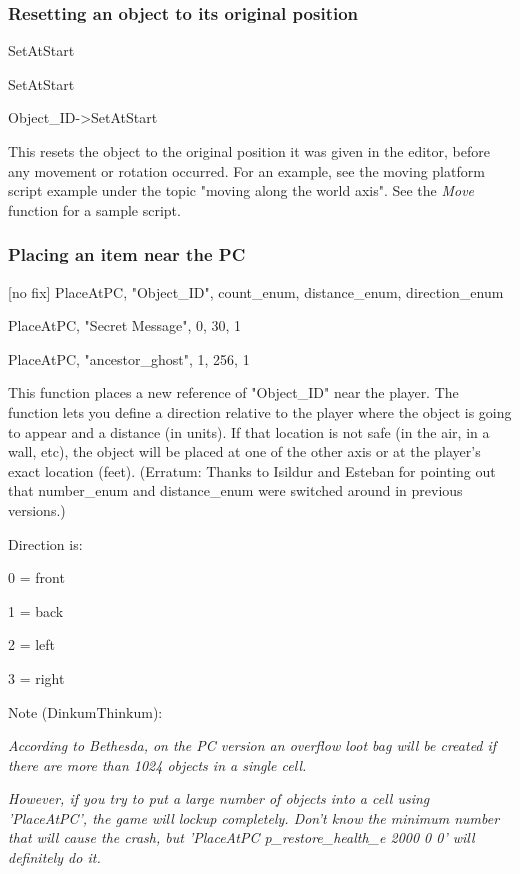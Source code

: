 \documentclass[
]{article}
\begin{document}
\hypertarget{resetting-an-object-to-its-original-position}{%
\subsubsection{Resetting an object to its original
position}\label{resetting-an-object-to-its-original-position}}

SetAtStart

SetAtStart

Object\_ID-\textgreater SetAtStart

This resets the object to the original position it was given in the
editor, before any movement or rotation occurred. For an example, see
the moving platform script example under the topic "moving along the
world axis". See the \emph{Move} function for a sample script.

\hypertarget{placing-an-item-near-the-pc}{%
\subsubsection{Placing an item near the
PC}\label{placing-an-item-near-the-pc}}

{[}no fix{]} PlaceAtPC, "Object\_ID", count\_enum, distance\_enum,
direction\_enum

PlaceAtPC, "Secret Message", 0, 30, 1

PlaceAtPC, "ancestor\_ghost", 1, 256, 1

This function places a new reference of "Object\_ID" near the player.
The function lets you define a direction relative to the player where
the object is going to appear and a distance (in units). If that
location is not safe (in the air, in a wall, etc), the object will be
placed at one of the other axis or at the player's exact location
(feet). (Erratum: Thanks to Isildur and Esteban for pointing out that
number\_enum and distance\_enum were switched around in previous
versions.)

Direction is:

0 = front

1 = back

2 = left

3 = right

Note (DinkumThinkum):

\emph{According to Bethesda, on the PC version an overflow loot bag will
be created if there are more than 1024 objects in a single cell.}

\emph{\hfill\break
However, if you try to put a large number of objects into a cell using
'PlaceAtPC', the game will lockup completely. Don't know the minimum
number that will cause the crash, but 'PlaceAtPC p\_restore\_health\_e
2000 0 0' will definitely do it.}%
\end{document}
